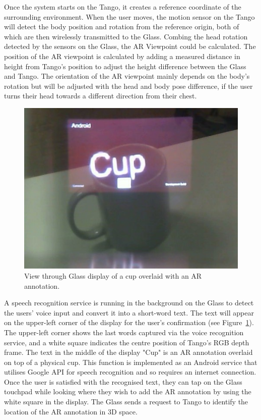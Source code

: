 Once the system starts on the Tango, it creates a reference coordinate of the surrounding environment. When the user moves, the motion sensor on the Tango will detect the body position and rotation from the reference origin, both of which are then wirelessly transmitted to the Glass. Combing the head rotation detected by the sensors on the Glass, the AR Viewpoint could be calculated. The position of the AR viewpoint is calculated by adding a measured distance in height from Tango's position to adjust the height difference between the Glass and Tango. The orientation of the AR viewpoint mainly depends on the body's rotation but will be adjusted with the head and body pose difference, if the user turns their head towards a different direction from their chest. 

\begin{figure}[ht]
  \centering
  \includegraphics[width=0.8\linewidth]{images/mgia15/WIN_20150614_204531_2.jpg}
  \caption{View through Glass display of a cup overlaid with an AR annotation.}
  \label{fig:mgia15:ui}
\end{figure}

A speech recognition service is running in the background on the Glass to detect the users' voice input and convert it into a short-word text. The text will appear on the upper-left corner of the display for the user's confirmation (see Figure~\ref{fig:mgia15:ui}). The upper-left corner shows the last words captured via the voice recognition service, and a white square indicates the centre position of Tango's RGB depth frame. The text in the middle of the display "Cup" is an AR annotation overlaid on top of a physical cup. This function is implemented as an Android service that utilises Google API for speech recognition and so requires an internet connection. Once the user is satisfied with the recognised text, they can tap on the Glass touchpad while looking where they wish to add the AR annotation by using the white square in the display. The Glass sends a request to Tango to identify the location of the AR annotation in 3D space.


